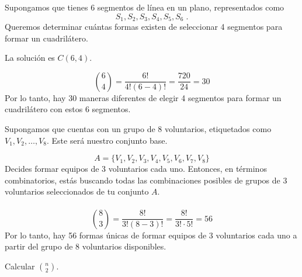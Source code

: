 \begin{ejemplo}
Supongamos que tienes 6 segmentos de línea en un plano, representados como \[ S_1, S_2, S_3, S_4, S_5, S_6\;. \] Queremos determinar cuántas formas existen de seleccionar 4 segmentos para formar un cuadrilátero. 
\end{ejemplo}

\begin{solucion}
La solución es \( C(6, 4) \).

\[ \binom{6}{4} = \frac{6!}{4!(6-4)!} = \frac{720}{24} = 30 \]
Por lo tanto, hay 30 maneras diferentes de elegir 4 segmentos para formar un cuadrilátero con estos 6 segmentos. 
\end{solucion}



\begin{ejemplo}
Supongamos que cuentas con un grupo de 8 voluntarios, etiquetados como \(V_1, V_2, \ldots, V_8\). Este será nuestro conjunto base.
\end{ejemplo}

\begin{solucion}
\[ A = \{V_1, V_2, V_3, V_4, V_5, V_6, V_7, V_8\} \]
Decides formar equipos de 3 voluntarios cada uno. Entonces, en términos combinatorios, estás buscando todas las combinaciones posibles de grupos de 3 voluntarios seleccionados de tu conjunto \(A\).\\\\
\[ \binom{8}{3} = \frac{8!}{3!(8-3)!} = \frac{8!}{3! \cdot 5!} =56\]
Por lo tanto, hay 56 formas únicas de formar equipos de 3 voluntarios cada uno a partir del grupo de 8 voluntarios disponibles.   
\end{solucion}

\begin{ejemplo}
Calcular $\displaystyle \binom{n}{2}$.
\end{ejemplo}

